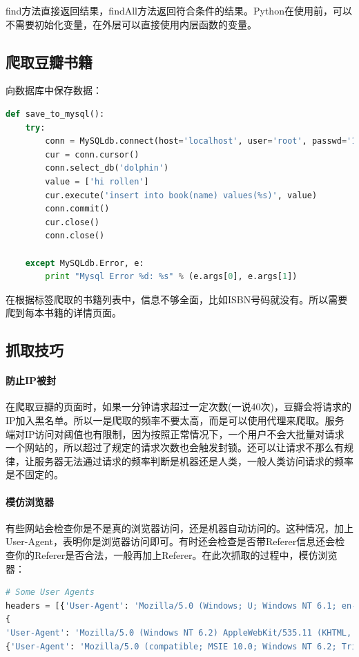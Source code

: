 \documentclass[letter]{book}
\begin{document}
find方法直接返回结果，findAll方法返回符合条件的结果。Python在使用前，可以不需要初始化变量，在外层可以直接使用内层函数的变量。

\subsection{爬取豆瓣书籍}

向数据库中保存数据：

\begin{lstlisting}[language=Python]
def save_to_mysql():
	try:
		conn = MySQLdb.connect(host='localhost', user='root', passwd='123456', port=3306)
		cur = conn.cursor()
		conn.select_db('dolphin')
		value = ['hi rollen']
		cur.execute('insert into book(name) values(%s)', value)
		conn.commit()
		cur.close()
		conn.close()
	
	except MySQLdb.Error, e:
		print "Mysql Error %d: %s" % (e.args[0], e.args[1])
\end{lstlisting}

在根据标签爬取的书籍列表中，信息不够全面，比如ISBN号码就没有。所以需要爬到每本书籍的详情页面。

\subsection{抓取技巧}

\paragraph{防止IP被封}在爬取豆瓣的页面时，如果一分钟请求超过一定次数(一说40次)，豆瓣会将请求的IP加入黑名单。所以一是爬取的频率不要太高，而是可以使用代理来爬取。服务端对IP访问对阈值也有限制，因为按照正常情况下，一个用户不会大批量对请求一个网站的，所以超过了规定的请求次数也会触发封锁。还可以让请求不那么有规律，让服务器无法通过请求的频率判断是机器还是人类，一般人类访问请求的频率是不固定的。

\paragraph{模仿浏览器}有些网站会检查你是不是真的浏览器访问，还是机器自动访问的。这种情况，加上User-Agent，表明你是浏览器访问即可。有时还会检查是否带Referer信息还会检查你的Referer是否合法，一般再加上Referer。在此次抓取的过程中，模仿浏览器：

\begin{lstlisting}[language=Python]
# Some User Agents
headers = [{'User-Agent': 'Mozilla/5.0 (Windows; U; Windows NT 6.1; en-US; rv:1.9.1.6) Gecko/20091201 Firefox/3.5.6'}, \
{
'User-Agent': 'Mozilla/5.0 (Windows NT 6.2) AppleWebKit/535.11 (KHTML, like Gecko) Chrome/17.0.963.12 Safari/535.11'}, \
{'User-Agent': 'Mozilla/5.0 (compatible; MSIE 10.0; Windows NT 6.2; Trident/6.0)'}]
\end{lstlisting}
\end{document}
